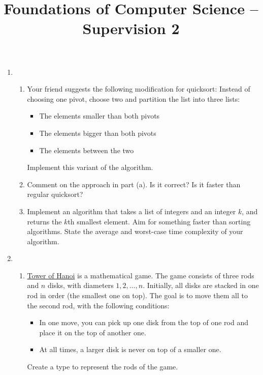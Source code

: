 \documentclass[11pt,a4paper]{article}
\title{Foundations of Computer Science -- Supervision 2}
\author{}
\date{}
\begin{document}
\maketitle


\begin{enumerate}

\item
\begin{enumerate}
    \item Your friend suggests the following modification for quicksort:  
    Instead of choosing one pivot, choose two and partition the list into three lists:
    \begin{itemize}
        \item The elements smaller than both pivots
        \item The elements bigger than both pivots
        \item The elements between the two
    \end{itemize}
    Implement this variant of the algorithm.

    \item Comment on the approach in part (a). Is it correct? Is it faster than regular quicksort?

    \item Implement an algorithm that takes a list of integers and an integer $k$, and 
    returns the $k$th smallest element. Aim for something faster than sorting 
    algorithms. State the average and worst-case time complexity of your algorithm.
\end{enumerate}

\item
\begin{enumerate}
    \item \href{https://en.wikipedia.org/wiki/Tower_of_Hanoi}{Tower of Hanoi} is a mathematical game.  
    The game consists of three rods and $n$ disks, with diameters $1,2,\dots,n$.  
    Initially, all disks are stacked in one rod in order (the smallest one on top).  
    The goal is to move them all to the second rod, with the following conditions:
    \begin{itemize}
        \item In one move, you can pick up one disk from the top of one rod and place it on the top of another one.
        \item At all times, a larger disk is never on top of a smaller one.
    \end{itemize}
    Create a type to represent the rods of the game.


\end{enumerate}
\end{enumerate}
\end{document}
